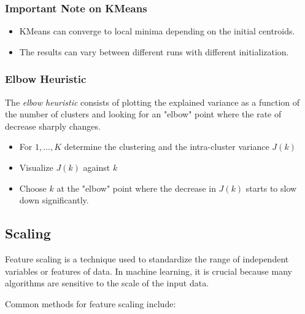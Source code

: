 \subsubsection*{Important Note on KMeans}

\begin{itemize}

    \item KMeans can converge to local minima depending on the initial centroids. 
    
    \item The results can vary between different runs with different initialization.

\end{itemize}

\subsubsection{Elbow Heuristic}

The \emph{elbow heuristic} consists of plotting the explained variance as a function of the number of clusters and looking for an "elbow" point 
where the rate of decrease sharply changes.

\begin{itemize}

    \item For \(1, \dots, K\) determine the clustering and the intra-cluster variance \(J(k)\) 

    \item Visualize \(J(k)\) against \(k\) 
    
    \item Choose \(k\) at the "elbow" point where the decrease in \(J(k)\) starts to slow down significantly.

\end{itemize}

\subsection{Scaling}

Feature scaling is a technique used to standardize the range of independent variables or features of data.
In machine learning, it is crucial because many algorithms are sensitive to the scale of the input data.

Common methods for feature scaling include:

